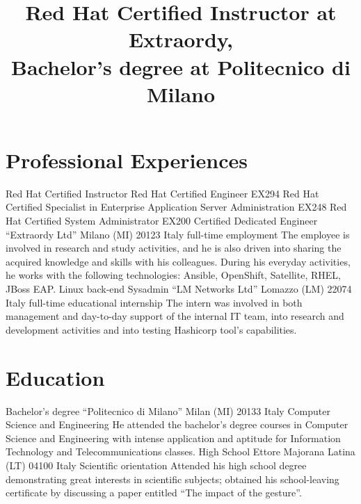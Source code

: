 
\title{\normalsize%
    Red Hat Certified Instructor at Extraordy,\\Bachelor's degree at Politecnico di Milano
}
\maketitle

\section{Professional Experiences}
    {Red Hat Certified Instructor}
    {}
    {}
    {}
    {}
    {Red Hat Certified Engineer}
    {EX294}
    {}
    {}
    {}
    {Red Hat Certified Specialist in Enterprise Application Server Administration}
    {EX248}
    {}
    {}
    {}
    {Red Hat Certified System Administrator}
    {EX200}
    {}
    {}
    {}
    {Certified Dedicated Engineer}
    {``Extraordy Ltd''}
    {Milano (MI) 20123 Italy}
    {full-time employment}
    {The employee is involved in research and study activities, and he is also driven into sharing the acquired knowledge and skills with his colleagues. During his everyday activities, he works with the following technologies: Ansible, OpenShift, Satellite, RHEL, JBoss EAP.}
    {Linux back-end Sysadmin}
    {``LM Networks Ltd''}
    {Lomazzo (LM) 22074 Italy}
    {full-time educational internship}
    {The intern was involved in both management and day-to-day support of the internal IT team, into research and development activities and into testing Hashicorp tool's capabilities.}

\section{Education}
    {Bachelor's degree}
    {``Politecnico di Milano''}
    {Milan (MI) 20133 Italy}
    {Computer Science and Engineering}
    {He attended the bachelor's degree courses in Computer Science and Engineering with intense application and aptitude for Information Technology and Telecommunications classes.}
    {High School}
    {Ettore Majorana}
    {Latina (LT) 04100 Italy}
    {Scientific orientation}
    {Attended his high school degree demonstrating great interests in scientific subjects; obtained his school-leaving certificate by discussing a paper entitled ``The impact of the gesture''.}

